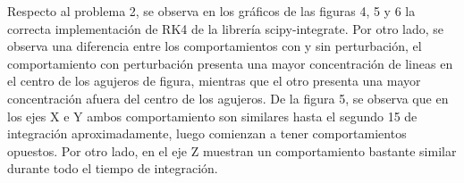 \documentclass[letterpaper,oneside]{article}
\begin{document}
Respecto al problema 2, se observa en los gráficos de las figuras 4, 5 y 6 la correcta implementación de RK4 de la librería scipy-integrate. Por otro lado, se observa una diferencia entre los comportamientos con y sin perturbación, el comportamiento con perturbación presenta una mayor concentración de lineas en el centro de los agujeros de figura, mientras que el otro presenta una mayor concentración afuera del centro de los agujeros. De la figura 5, se observa que en los ejes X e Y ambos comportamiento son similares hasta el segundo 15 de integración aproximadamente, luego comienzan a tener comportamientos opuestos. Por otro lado, en el eje Z muestran un comportamiento bastante similar durante todo el tiempo de integración.

\end{document}
